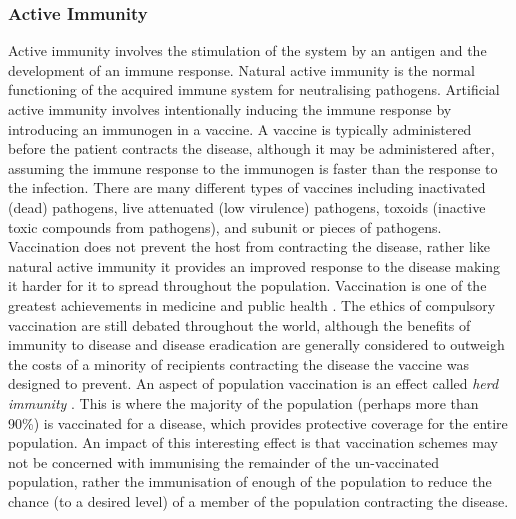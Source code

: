 %
%
\subsubsection{Active Immunity}
Active immunity involves the stimulation of the system by an antigen and the development of an immune response. Natural active immunity is the normal functioning of the acquired immune system for neutralising pathogens. Artificial active immunity involves intentionally inducing the immune response by introducing an immunogen in a vaccine. A vaccine is typically administered before the patient contracts the disease, although it may be administered after, assuming the immune response to the immunogen is faster than the response to the infection. There are many different types of vaccines including inactivated (dead) pathogens, live attenuated (low virulence) pathogens, toxoids (inactive toxic compounds from pathogens), and subunit or pieces of pathogens. Vaccination does not prevent the host from contracting the disease, rather like natural active immunity it provides an improved response to the disease making it harder for it to spread throughout the population. Vaccination is one of the greatest achievements in medicine and public health \cite{Salmon2006}. The ethics of compulsory vaccination are still debated throughout the world, although the benefits of immunity to disease and disease eradication are generally considered to outweigh the costs of a minority of recipients contracting the disease the vaccine was designed to prevent. An aspect of population vaccination is an effect called \emph{herd immunity} \cite{Fine1993, Anderson1985, Anderson1990}. This is where the majority of the population (perhaps more than 90\%) is vaccinated for a disease, which provides protective coverage for the entire population. An impact of this interesting effect is that vaccination schemes may not be concerned with immunising the remainder of the un-vaccinated population, rather the immunisation of enough of the population to reduce the chance (to a desired level) of a member of the population contracting the disease.

%
%
